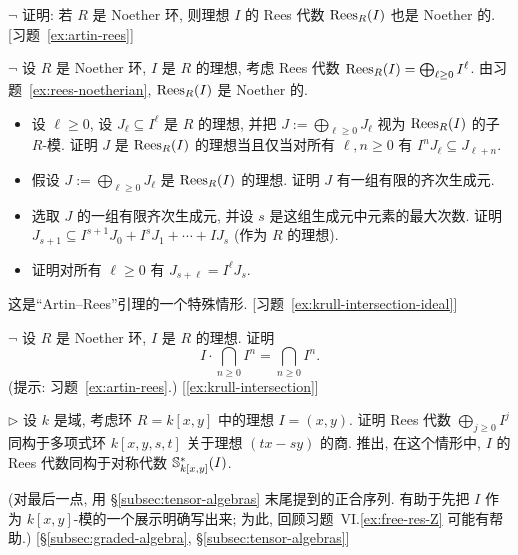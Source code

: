 \begin{prob}\label{ex:rees-noetherian}
$\neg$ 证明: 若 $R$ 是 Noether 环, 则理想 $I$ 的 Rees 代数 $\operatorname{Rees}_R(I)$ 也是 Noether 的. [习题~\ref{ex:artin-rees}]
\end{prob}

\begin{prob}\label{ex:artin-rees}
$\neg$ 设 $R$ 是 Noether 环, $I$ 是 $R$ 的理想, 考虑 Rees 代数 $\operatorname{Rees}_R(I)=\bigoplus_{\ell\ge0}I^\ell$. 由习题~\ref{ex:rees-noetherian}, $\operatorname{Rees}_R(I)$ 是 Noether 的.
\begin{itemize}
\item 设 $\ell\ge0$, 设 $J_\ell\subseteq I^\ell$ 是 $R$ 的理想, 并把 $J:=\bigoplus_{\ell\ge0}J_\ell$ 视为 $\operatorname{Rees}_R(I)$ 的子 $R$-模. 证明 $J$ 是 $\operatorname{Rees}_R(I)$ 的理想当且仅当对所有 $\ell,n\ge0$ 有 $I^nJ_\ell\subseteq J_{\ell+n}$.
\item 假设 $J:=\bigoplus_{\ell\ge0}J_\ell$ 是 $\operatorname{Rees}_R(I)$ 的理想. 证明 $J$ 有一组有限的齐次生成元.
\item 选取 $J$ 的一组有限齐次生成元, 并设 $s$ 是这组生成元中元素的最大次数. 证明 $J_{s+1}\subseteq I^{s+1}J_0+I^sJ_1+\cdots+IJ_s$ (作为 $R$ 的理想).
\item 证明对所有 $\ell\ge0$ 有 $J_{s+\ell}=I^\ell J_s$.
\end{itemize}
这是``Artin--Rees''引理的一个特殊情形. [习题~\ref{ex:krull-intersection-ideal}]
\end{prob}

\begin{prob}\label{ex:krull-intersection-ideal}
$\neg$ 设 $R$ 是 Noether 环, $I$ 是 $R$ 的理想. 证明
\[
I\cdot\bigcap_{n\ge0}I^n=\bigcap_{n\ge0}I^n.
\]
(提示: 习题~\ref{ex:artin-rees}.) [\ref{ex:krull-intersection}]
\end{prob}

\begin{prob}\label{ex:rees-symmetric}
$\triangleright$ 设 $k$ 是域, 考虑环 $R=k[x,y]$ 中的理想 $I=(x,y)$. 证明 Rees 代数 $\bigoplus_{j\ge0}I^j$ 同构于多项式环 $k[x,y,s,t]$ 关于理想 $(tx-sy)$ 的商. 推出, 在这个情形中, $I$ 的 Rees 代数同构于对称代数 $\mathbb{S}_{k[x,y]}^*(I)$.

(对最后一点, 用 §\ref{subsec:tensor-algebras} 末尾提到的正合序列. 有助于先把 $I$ 作为 $k[x,y]$-模的一个展示明确写出来; 为此, 回顾习题~VI.\ref{ex:free-res-Z} 可能有帮助.) [§\ref{subsec:graded-algebra}, §\ref{subsec:tensor-algebras}]
\end{prob}


